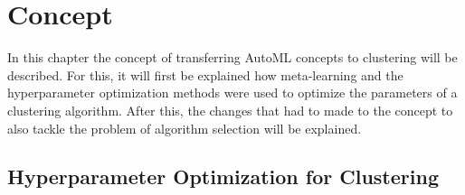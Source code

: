 \chapter{Concept}

In this chapter the concept of transferring \gls{AutoML} concepts to clustering will be described.
For this, it will first be explained how meta-learning and the hyperparameter optimization methods were used to optimize the parameters of a clustering algorithm.
After this, the changes that had to made to the concept to also tackle the problem of algorithm selection  will be explained.


\section{Hyperparameter Optimization for Clustering}

